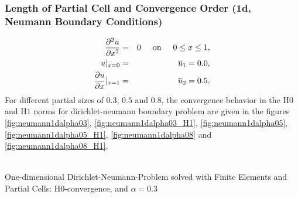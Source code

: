 \documentclass[a4paper,12pt]{article}
\makeatletter
\newenvironment{figurehere}
  {\def\@captype{figure}}
  {}
\makeatother
\begin{document}
\subsubsection{Length of Partial Cell and Convergence Order (1d, Neumann Boundary Conditions)}
\begin{eqnarray}
\frac{\partial^2 u}{\partial x^2} &=& 0 \hspace{0.5cm}\text{on}\hspace{0.5cm}0 \leq x\leq 1,\\
u\vert_{x=0} &=& \overline{u}_1 = 0.0,\\
\frac{\partial u}{\partial x}\vert_{x=1} &=& \overline{u}_2 = 0.5,\\
\end{eqnarray}
For different partial sizes of $0.3$, $0.5$ and $0.8$, the convergence behavior in the H$0$ and H$1$ norms for dirichlet-neumann boundary problem are given in the figures \ref{fig:neumann1dalpha03}, \ref{fig:neumann1dalpha03_H1}, \ref{fig:neumann1dalpha05}, \ref{fig:neumann1dalpha05_H1}, \ref{fig:neumann1dalpha08} and \ref{fig:neumann1dalpha08_H1}.
\begin{center}
\begin{figurehere}
\\
\caption{One-dimensional Dirichlet-Neumann-Problem solved with Finite Elements and Partial Cells: H$0$-convergence, and $\alpha = 0.3$}\label{fig:neumann1dalpha03}
\end{figurehere}
\end{center}
\end{document}
